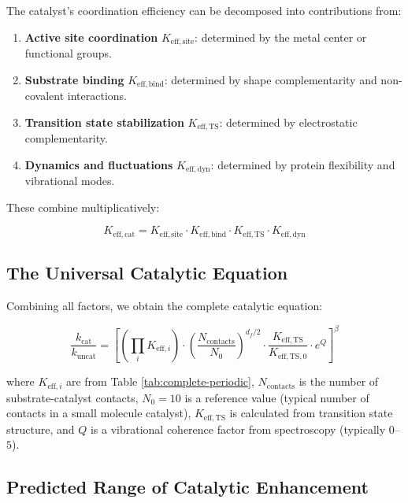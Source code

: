\documentclass[12pt,a4paper]{article}
\theoremstyle{remark}
\newcommand{\df}{d_{\!f}}
\begin{document}
	The catalyst's coordination efficiency can be decomposed into contributions from:
	\begin{enumerate}
		\item \textbf{Active site coordination} $K_{\mathrm{eff},\text{site}}$: determined by the metal center or functional groups.
		\item \textbf{Substrate binding} $K_{\mathrm{eff},\text{bind}}$: determined by shape complementarity and non-covalent interactions.
		\item \textbf{Transition state stabilization} $K_{\mathrm{eff},\text{TS}}$: determined by electrostatic complementarity.
		\item \textbf{Dynamics and fluctuations} $K_{\mathrm{eff},\text{dyn}}$: determined by protein flexibility and vibrational modes.
	\end{enumerate}
	
	These combine multiplicatively:
	
	\begin{equation}
		K_{\mathrm{eff},\text{cat}} = K_{\mathrm{eff},\text{site}} \cdot K_{\mathrm{eff},\text{bind}} \cdot K_{\mathrm{eff},\text{TS}} \cdot K_{\mathrm{eff},\text{dyn}}
		\label{eq:keff-cat}
	\end{equation}
	
	\subsection{The Universal Catalytic Equation}
	
	Combining all factors, we obtain the complete catalytic equation:
	
	\begin{equation}
		\boxed{\frac{k_{\text{cat}}}{k_{\text{uncat}}} = \left[ \left(\prod_i K_{\mathrm{eff},i}\right) \cdot \left(\frac{N_{\text{contacts}}}{N_0}\right)^{\df/2} \cdot \frac{K_{\mathrm{eff},\text{TS}}}{K_{\mathrm{eff},\text{TS},0}} \cdot e^{Q} \right]^{\beta}}
		\label{eq:cat-universal}
	\end{equation}
	
	where $K_{\mathrm{eff},i}$ are from Table \ref{tab:complete-periodic}, $N_{\text{contacts}}$ is the number of substrate-catalyst contacts, $N_0 = 10$ is a reference value (typical number of contacts in a small molecule catalyst), $K_{\mathrm{eff},\text{TS}}$ is calculated from transition state structure, and $Q$ is a vibrational coherence factor from spectroscopy (typically $0$--$5$).
	
	\subsection{Predicted Range of Catalytic Enhancement}
	
\end{document}
